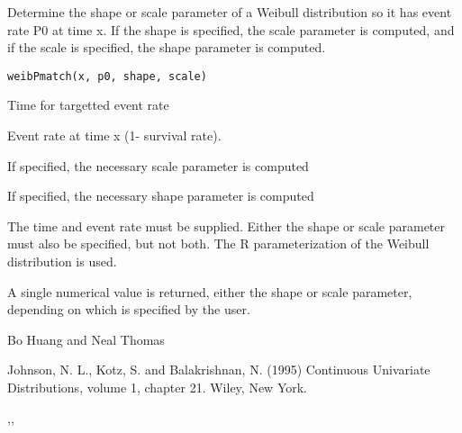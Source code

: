 \begin{Description}\relax
Determine the shape or scale parameter of a Weibull distribution so
it has event rate P0 at time x.  If the shape is specified, the scale
parameter is computed, and if the scale is specified, the shape
parameter is computed.
\end{Description}
\begin{Usage}
\begin{verbatim}
weibPmatch(x, p0, shape, scale)
\end{verbatim}
\end{Usage}
\begin{Arguments}
\begin{ldescription}
\item[\code{x}] Time for targetted event rate 
\item[\code{p0}] Event rate at time x (1- survival rate). 
\item[\code{shape}] If specified, the necessary scale parameter is computed 
\item[\code{scale}] If specified, the necessary shape parameter is computed  
\end{ldescription}
\end{Arguments}
\begin{Details}\relax
The time and event rate must be supplied.  Either the shape or
scale parameter must also be specified, but not both.  The R
parameterization of the Weibull distribution is used.
\end{Details}
\begin{Value}
A single numerical value is returned, either the shape or scale
parameter, depending on which is specified by the user.
\end{Value}
\begin{Author}\relax
Bo Huang  and Neal Thomas
\end{Author}
\begin{References}\relax
Johnson, N. L., Kotz, S. and Balakrishnan, N. (1995) Continuous
Univariate Distributions, volume 1, chapter 21. Wiley, New York.
\end{References}
\begin{SeeAlso}\relax
{},, 
\end{SeeAlso}
